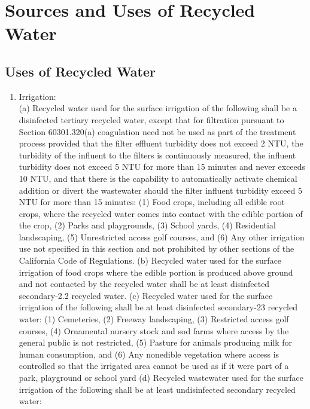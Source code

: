 
\chapter{Sources and Uses of Recycled Water}

\section{Uses of Recycled Water} 
\begin{enumerate}
\item Irrigation:\\
(a) Recycled water used for the surface irrigation of the following shall be a disinfected tertiary recycled water, except that for filtration pursuant to Section 60301.320(a) coagulation need not be used as part of the treatment process provided that the filter effluent turbidity does not exceed 2 NTU, the turbidity of the influent to the filters is continuously measured, the influent turbidity does not exceed 5 NTU for more than 15 minutes and never exceeds 10 NTU, and that there is the capability to automatically activate chemical addition or divert the wastewater should the filter influent turbidity exceed 5 NTU for more than 15 minutes:
(1) Food crops, including all edible root crops, where the recycled water comes into contact with the edible portion of the crop,
(2) Parks and playgrounds,
(3) School yards,
(4) Residential landscaping,
(5) Unrestricted access golf courses, and
(6) Any other irrigation use not specified in this section and not prohibited by other sections of the California Code of Regulations.
(b) Recycled water used for the surface irrigation of food crops where the edible portion is produced above ground and not contacted by the recycled water shall be at least disinfected secondary-2.2 recycled water.
(c) Recycled water used for the surface irrigation of the following shall be at least disinfected secondary-23 recycled water:
(1) Cemeteries,
(2) Freeway landscaping,
(3) Restricted access golf courses,
(4) Ornamental nursery stock and sod farms where access by the general public is not restricted,
(5) Pasture for animals producing milk for human consumption, and
(6) Any nonedible vegetation where access is controlled so that the irrigated area cannot be used as if it were part of a park, playground or school yard
(d) Recycled wastewater used for the surface irrigation of the following shall be at least undisinfected secondary recycled water:

\end{enumerate}
